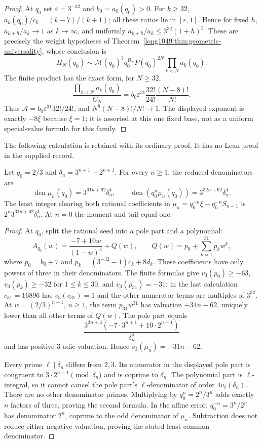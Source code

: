 \documentclass[11pt]{article}
\begin{document}
\begin{proof}
At $q_0$ set $\varepsilon=3^{-32}$ and $b_0=a_0(q_0)>0$.  For $k\ge32$,
$a_k(q_0)/c_k=(k-7)/(k+1)$; all these ratios lie in
$[\varepsilon,1]$.  Hence for fixed $h$,
$a_{k+h}/a_k\to1$ as $k\to\infty$, and uniformly
$a_{k+h}/a_k\le3^{32}(1+h)^3$.
These are precisely the weight hypotheses of
Theorem~\ref{long1049:thm:geometric-universality}, whose conclusion is
\[
 H_N(q_0)\sim\mathcal M(q_0)^3q_0^{B_N}P(q_0)^{2N}
                  \prod_{k<N}a_k(q_0).
\]
The finite product has the exact form, for $N\ge32$,
\[
 \frac{\prod_{k<N}a_k(q_0)}{C_N}
 =b_0\varepsilon^{31}\frac{32!}{24!}\frac{(N-8)!}{N!}.
\]
Thus $\mathcal A=b_0\varepsilon^{31}32!/24!$, and
$N^8(N-8)!/N!\to1$.  The displayed exponent is exactly $-8\xi$
because $\xi=1$; it is asserted at this one fixed base, not as a
uniform special-value formula for this family.
\end{proof}

The following calculation is retained with its ordinary proof. It has
no Lean proof in the supplied record.

\begin{remark}
\label{long1049:thm:calibrated-denominators}
Let $q_0=2/3$ and $\delta_n=3^{n+1}-2^{n+1}$.  For every $n\ge1$,
the reduced denominators are
\[
 \operatorname{den}\mu_n(q_0)=3^{31n+62}\delta_n^4,
 \qquad
 \operatorname{den}(q_0^n\mu_n(q_0))=3^{32n+62}\delta_n^4.
\]
The least integer clearing both rational coefficients in
$\mu_n=q_0^{-n}\xi-q_0^{-n}S_{n-1}$ is
$2^n3^{31n+62}\delta_n^4$.  At $n=0$ the moment and tail equal one.
\end{remark}

\begin{proof}
At $q_0$, split the rational seed into a pole part and a polynomial:
\[
 A_{q_0}(w)=\frac{-7+10w}{(1-w)^4}+Q(w),\qquad
 Q(w)=p_0+\sum_{k=1}^{31}p_kw^k,
\]
where $p_0=b_0+7$ and
$p_k=(3^{-32}-1)c_k+8d_k$.  These coefficients have only powers
of three in their denominators.  The finite formulas give
$v_3(p_0)\ge-63$, $v_3(p_k)\ge-32$ for $1\le k\le30$, and
$v_3(p_{31})=-31$: in the last calculation $c_{31}=16896$ has
$v_3(c_{31})=1$ and the other numerator terms are multiples of
$3^{32}$.  At $w=(2/3)^{n+1}$, $n\ge1$, the term
$p_{31}w^{31}$ has valuation $-31n-62$, uniquely lower than all
other terms of $Q(w)$.  The pole part equals
\[
 \frac{3^{3n+3}(-7\cdot3^{n+1}+10\cdot2^{n+1})}{\delta_n^4}
\]
and has positive $3$-adic valuation.  Hence
$v_3(\mu_n)=-31n-62$.

Every prime $\ell\mid\delta_n$ differs from $2,3$.
Its numerator in the displayed pole part is congruent to
$3\cdot2^{n+1}\pmod{\delta_n}$ and is coprime to $\delta_n$.
The polynomial part is $\ell$-integral, so it cannot cancel the
pole part's $\ell$-denominator of order $4v_\ell(\delta_n)$.
There are no other denominator primes.  Multiplying by
$q_0^n=2^n/3^n$ adds exactly $n$ factors of three, proving the second
formula.  In the affine error, $q_0^{-n}=3^n/2^n$ has denominator
$2^n$, coprime to the odd denominator of $\mu_n$.  Subtraction does
not reduce either negative valuation, proving the stated least
common denominator.
\end{proof}
\end{document}
